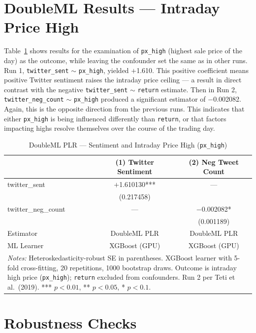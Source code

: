 \documentclass[12pt]{article}
\begin{document}
\newpage
\section{DoubleML Results --- Intraday Price High}

Table~\ref{tab:dml_px_high} shows results for the examination of \texttt{px\_high} (highest sale price of the day) as the outcome, while leaving the confounder set the same as in other runs. Run 1, \texttt{twitter\_sent} $\sim$ \texttt{px\_high}, yielded $+$1.610. This positive coefficient means positive Twitter sentiment raises the intraday price ceiling --- a result in direct contrast with the negative \texttt{twitter\_sent} $\sim$ \texttt{return} estimate. Then in Run 2, \texttt{twitter\_neg\_count} $\sim$ \texttt{px\_high} produced a significant estimator of $-$0.002082. Again, this is the opposite direction from the previous runs. This indicates that either \texttt{px\_high} is being influenced differently than \texttt{return}, or that factors impacting highs resolve themselves over the course of the trading day.

\begin{table}[htbp]
\centering
\caption{DoubleML PLR --- Sentiment and Intraday Price High (\texttt{px\_high})}
\label{tab:dml_px_high}
\begin{tabular}{lcc}
\hline\hline
 & (1) Twitter Sentiment & (2) Neg Tweet Count \\
\hline
twitter\_sent & $+$1.610130*** & --- \\
& (0.217458) &  \\
twitter\_neg\_count & --- & $-$0.002082* \\
&  & (0.001189) \\
\hline
Estimator & DoubleML PLR & DoubleML PLR \\
ML Learner & XGBoost (GPU) & XGBoost (GPU) \\
\hline\hline
\multicolumn{3}{p{0.9\linewidth}}{\footnotesize \textit{Notes:} Heteroskedasticity-robust SE in parentheses. XGBoost learner with 5-fold cross-fitting, 20 repetitions, 1000 bootstrap draws. Outcome is intraday high price (\texttt{px\_high}); \texttt{return} excluded from confounders. Run 2 per Teti et al.\ (2019). *** $p<0.01$, ** $p<0.05$, * $p<0.1$.}
\end{tabular}
\end{table}

\newpage
\section{Robustness Checks}
\end{document}
